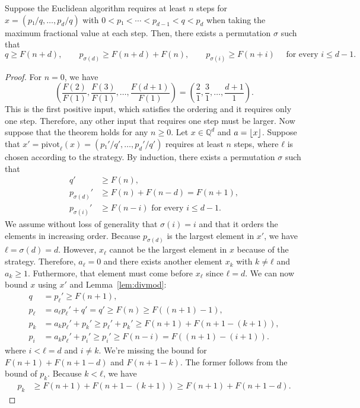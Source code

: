 \begin{theorem}
  Suppose the Euclidean algorithm requires at least $n$ steps for $x = (p₁/q, …, p_d/q)$
  with $0 < p₁ < ⋯ < p_{d-1} < q < p_d$ when taking the maximum fractional value at each step.
  Then, there exists a permutation $σ$ such that
  \[
    q ≥ F(n+d),
    \qquad
    p_{σ(d)} ≥ F(n + d) + F(n),
    \qquad
    p_{σ(i)} ≥ F(n + i)
    \quad
    \text{ for every } i ≤ d - 1.
  \]
\end{theorem}

\begin{proof}
  For $n = 0$, we have
  \[
    \left(\frac{F(2)}{F(1)}, \frac{F(3)}{F(1)}, …, \frac{F(d+1)}{F(1)} \right)
    = \left(\frac{2}{1}, \frac{3}{1}, …, \frac{d+1}{1} \right).
  \]
  This is the first positive input, which satisfies the ordering and it requires only one step.
  Therefore, any other input that requires one step must be larger.
  Now suppose that the theorem holds for any $n ≥ 0$.
  Let $x ∈ ℚ^d$ and $a = \left\lfloor x\right\rfloor$.
  Suppose that $x' = \mathrm{pivot}_ℓ(x) = (p₁'/q', …, p_d'/q')$ requires at
  least $n$ steps, where $ℓ$ is chosen according to the strategy.
  By induction, there exists a permutation $σ$ such that
  \begin{align*}
    q'        & ≥ F(n),                     \\
    p_{σ(d)}' & ≥ F(n) + F(n - d) = F(n+1), \\
    p_{σ(i)}' & ≥ F(n - i)
    \text{ for every } i ≤ d - 1.
  \end{align*}
  We assume without loss of generality that $σ(i) = i$ and that it orders the elements in increasing order.
  Because $p_{σ(d)}$ is the largest element in $x'$, we have $ℓ = σ(d) = d$.
  However, $x_ℓ$ cannot be the largest element in $x$ because of the strategy.
  Therefore, $a_ℓ = 0$ and there exists another element $x_k$ with $k ≠ ℓ$ and $a_k ≥ 1$.
  Futhermore, that element must come before $x_ℓ$ since $ℓ = d$.
  We can now bound $x$ using $x'$ and Lemma~\ref{lem:divmod}:
  \begin{align*}
    q   & = p_ℓ' ≥ F(n+1), \\
    p_ℓ & = a_ℓ p_ℓ' + q' = q' ≥ F(n) ≥ F((n+1) - 1), \\
    p_k & = a_k p_ℓ' + p_k' ≥ p_ℓ' + p_k' ≥ F(n + 1) + F(n + 1 - (k + 1)), \\
    p_i & = a_k p_ℓ' + p_i' ≥ p_i' ≥ F(n - i) = F((n+1) - (i+1)).
  \end{align*}
  where $i < ℓ = d$ and $i ≠ k$.
  We're missing the bound for $F(n+1) + F(n+1 - d)$ and $F(n + 1 - k)$.
  The former follows from the bound of $p_k$.
  Because $k < ℓ$, we have
  \begin{align*}
    p_k & ≥ F(n + 1) + F(n + 1 - (k + 1)) ≥ F(n+1) + F(n+1 - d).
  \end{align*}
\end{proof}

